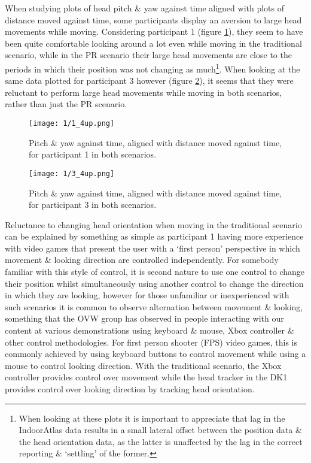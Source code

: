 
When studying plots of head pitch \& yaw against time aligned with plots of distance moved against time, some participants display an aversion to large head movements while moving. Considering participant 1 (figure \ref{1_4up.png}), they seem to have been quite comfortable looking around a lot even while moving in the traditional scenario, while in the PR scenario their large head movements are close to the periods in which their position was not changing as much\footnote{When looking at these plots it is important to appreciate that lag in the IndoorAtlas data results in a small lateral offset between the position data \& the head orientation data, as the latter is unaffected by the lag in the correct reporting \& `settling' of the former.}. When looking at the same data plotted for participant 3 however (figure \ref{3_4up.png}), it seems that they were reluctant to perform large head movements while moving in both scenarios, rather than just the PR scenario.

\begin{figure}
	\begin{center}
	\texttt{[image: 1/1\_4up.png]}
	\caption{Pitch \& yaw against time, aligned with distance moved against time, for participant 1 in both scenarios.}
	\label{1_4up.png}
	\end{center}
\end{figure}

\begin{figure}
	\begin{center}
	\texttt{[image: 1/3\_4up.png]}
	\caption{Pitch \& yaw against time, aligned with distance moved against time, for participant 3 in both scenarios.}
	\label{3_4up.png}
	\end{center}
\end{figure}

Reluctance to changing head orientation when moving in the traditional scenario can be explained by something as simple as participant 1 having more experience with video games that present the user with a `first person' perspective in which movement \& looking direction are controlled independently. For somebody familiar with this style of control, it is second nature to use one control to change their position whilst simultaneously using another control to change the direction in which they are looking, however for those unfamiliar or inexperienced with such scenarios it is common to observe alternation between movement \& looking, something that the OVW group has observed in people interacting with our content at various demonstrations using keyboard \& mouse, Xbox controller \& other control methodologies. For first person shooter (FPS) video games, this is commonly achieved by using keyboard buttons to control movement while using a mouse to control looking direction. With the traditional scenario, the Xbox controller provides control over movement while the head tracker in the DK1 provides control over looking direction by tracking head orientation.

